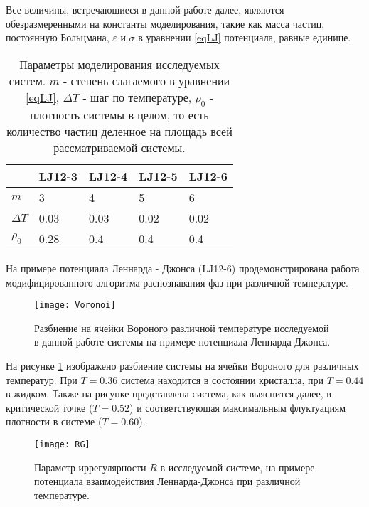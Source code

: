 Все величины, встречающиеся в данной работе далее, являются обезразмеренными на константы моделирования, такие как масса частиц, постоянную Больцмана, $\varepsilon$ и $\sigma$ в уравнении \ref{eqLJ} потенциала, равные единице.

\begin{table}[h]
\begin{center}
\begin{tabular}{| l | l | l | l | l |}
\hline
    & LJ12-3 & LJ12-4 & LJ12-5 & LJ12-6 \\ \hline
$m$   &    3    &     4   &    5    &    6    \\ \hline
$\Delta T$ & 0.03 & 0.03 & 0.02 & 0.02 \\ \hline
$\rho_0$ & 0.28  &  0.4  &  0.4  &  0.4  \\ \hline
\end{tabular}
\end{center}
\caption{Параметры моделирования исследуемых систем. $m$ - степень слагаемого в уравнении \ref{eqLJ}, $\Delta T$ - шаг по температуре,  $\rho_0$ - плотность системы в целом, то есть количество частиц деленное на площадь всей рассматриваемой системы.}
\label{tablParam}
\end{table}

На примере потенциала Леннарда - Джонса (LJ12-6) продемонстрирована работа модифицированного алгоритма распознавания фаз при различной температуре.

\begin{figure}[h]
\begin{center}
\texttt{[image: Voronoi]}
\caption{Разбиение на ячейки Вороного различной температуре исследуемой в данной работе системы на примере потенциала Леннарда-Джонса.}
\label{risvoronoiExp}
\end{center}
\end{figure}

На рисунке \ref{risvoronoiExp} изображено разбиение системы на ячейки Вороного для различных температур. При $T = 0.36$ система находится в состоянии кристалла, при $T = 0.44$ в жидком. Также на рисунке представлена система, как выяснится далее, в критической точке ($T = 0.52$) и соответствующая максимальным флуктуациям плотности в системе ($T = 0.60$).

\begin{figure}[h]
\begin{center}
\texttt{[image: RG]}
\caption{Параметр иррегулярности $R$ в исследуемой системе, на примере потенциала взаимодействия Леннарда-Джонса при различной температуре.}
\label{risIregExp}
\end{center}
\end{figure}

